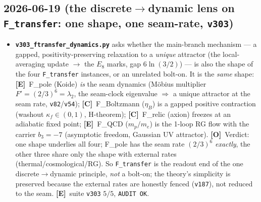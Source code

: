 \documentclass[11pt]{article}
\providecommand{\mE}{\textbf{[E]}}\providecommand{\mC}{\textbf{[C]}}
\providecommand{\mO}{\textbf{[O]}}\providecommand{\mX}{\textbf{[X]}}
\providecommand{\vref}[1]{\texttt{#1}}
\begin{document}
\subsection*{2026-06-19 (the discrete$\to$dynamic lens on \texttt{F\_transfer}: one shape, one seam-rate, \texttt{v303})}
\begin{itemize}
\item \textbf{\texttt{v303\_ftransfer\_dynamics.py}} asks whether the main-branch mechanism --- a gapped,
  positivity-preserving relaxation to a \emph{unique} attractor (the local-averaging update $\to$ the $E_8$ marks,
  gap $6\ln(3/2)$) --- is also the shape of the four \texttt{F\_transfer} instances, or an unrelated bolt-on. It
  is the \emph{same} shape: \mE\ F\_pole (Koide) \emph{is} the seam dynamics (M\"obius multiplier
  $F'{=}(2/3)^6{=}\lambda_2$, the seam-clock eigenvalue $\Rightarrow$ a unique attractor at the seam rate,
  \vref{v82}/\vref{v54}); \mC\ F\_Boltzmann ($\eta_B$) is a gapped positive contraction (washout
  $\kappa_f\in(0,1)$, H-theorem); \mC\ F\_relic (axion) freezes at an adiabatic fixed point; \mE\ F\_QCD
  ($m_p/m_e$) is the 1-loop RG flow with the carrier $b_3{=}-7$ (asymptotic freedom, Gaussian UV attractor). \mO\
  Verdict: one shape underlies all four; F\_pole has the seam rate $(2/3)^6$ \emph{exactly}, the other three share
  only the shape with external rates (thermal/cosmological/RG). So \texttt{F\_transfer} is the readout end of the
  one discrete$\to$dynamic principle, \emph{not} a bolt-on; the theory's simplicity is preserved because the
  external rates are honestly fenced (\vref{v187}), not reduced to the seam. \mE\ suite \texttt{v303} $5/5$,
  \texttt{AUDIT OK}.
\end{itemize}
\end{document}

